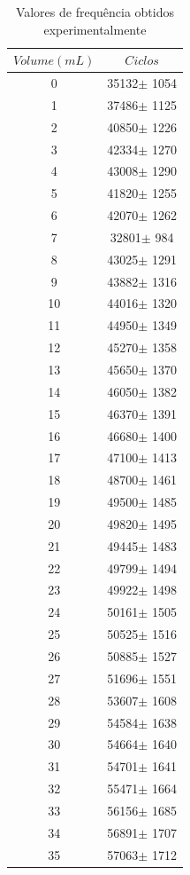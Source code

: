 \documentclass[a4paper]{instrumentacao}
\begin{document}
\begin{longtable}{cc}
\caption{Valores de frequência obtidos experimentalmente} \label{tab:resultados-pluviometro-ciclos} \\
\textbf{$Volume (mL)$} & \textbf{$Ciclos$} \\ \hline
 0 & 35132$\pm$ 1054 \\
 1 & 37486$\pm$ 1125 \\
 2 & 40850$\pm$ 1226 \\
 3 & 42334$\pm$ 1270 \\
 4 & 43008$\pm$ 1290 \\
 5 & 41820$\pm$ 1255 \\
 6 & 42070$\pm$ 1262 \\
 7 & 32801$\pm$ 984 \\
 8 & 43025$\pm$ 1291 \\
 9 & 43882$\pm$ 1316 \\
 10 & 44016$\pm$ 1320 \\
 11 & 44950$\pm$ 1349 \\
 12 & 45270$\pm$ 1358 \\
 13 & 45650$\pm$ 1370 \\
 14 & 46050$\pm$ 1382 \\
 15 & 46370$\pm$ 1391 \\
 16 & 46680$\pm$ 1400 \\
 17 & 47100$\pm$ 1413 \\
 18 & 48700$\pm$ 1461 \\
 19 & 49500$\pm$ 1485 \\
 20 & 49820$\pm$ 1495 \\
 21 & 49445$\pm$ 1483 \\
 22 & 49799$\pm$ 1494 \\
 23 & 49922$\pm$ 1498 \\
 24 & 50161$\pm$ 1505 \\
 25 & 50525$\pm$ 1516 \\
 26 & 50885$\pm$ 1527 \\
 27 & 51696$\pm$ 1551 \\
 28 & 53607$\pm$ 1608 \\
 29 & 54584$\pm$ 1638 \\
 30 & 54664$\pm$ 1640 \\
 31 & 54701$\pm$ 1641 \\
 32 & 55471$\pm$ 1664 \\
 33 & 56156$\pm$ 1685 \\
 34 & 56891$\pm$ 1707 \\
 35 & 57063$\pm$ 1712 \\

\end{longtable}
\end{document}
